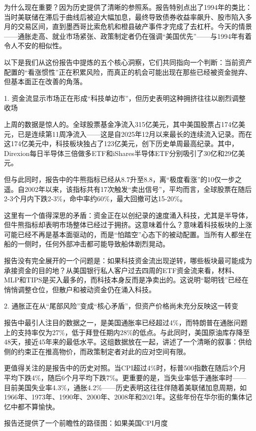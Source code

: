 \documentclass[11pt]{ctexart}
\begin{document}
为什么现在重要？因为历史提供了清晰的参照系。报告特别点出了1994年的类比：当时美联储在滞后于曲线后被迫大幅加息，最终导致债券收益率飙升、股市陷入多月的交易区间，直到墨西哥比索危机和橙县破产事件才完成了去杠杆。今天的情景——通胀走高、就业市场紧张、政策制定者仍在强调“美国优先”——与1994年有着令人不安的相似性。

以下是我们从这份报告中提炼的五个核心洞察，它们共同指向一个判断：当前资产配置的“看涨惯性”正在积累风险，而真正的机会可能出现在那些已经被资金抛弃、但基本面正在改善的角落。

1. 资金流显示市场正在形成“科技单边市”，但历史表明这种拥挤往往以剧烈调整收场

上周的数据是惊人的。全球股票基金净流入315亿美元，其中美国股票占174亿美元，已是连续第11周净流入——这是自2025年12月以来最长的连续流入记录。而在这174亿美元中，科技板块独占了123亿美元，创下历史单周最高纪录。其中，Direxion每日半导体三倍做多ETF和iShares半导体ETF分别吸引了30亿和29亿美元。

但与此同时，报告中的牛熊指标已经从8.7升至8.8，离“极度看涨”的10仅一步之遥。自2002年以来，该指标共有17次触发“卖出信号”，平均而言，全球股票在随后2-3个月内下跌2-3\%，命中率约60\%，最大回撤可达15-20\%。

这里有一个值得深思的矛盾：资金正在以创纪录的速度涌入科技，尤其是半导体，但牛熊指标却表明市场整体已经过于拥挤。这意味着什么？意味着科技板块的上涨可能已经不再是基本面驱动的，而是“怕踏空”心态下的被动配置。当所有人都坐在船的一侧时，任何外部冲击都可能导致船体剧烈晃动。

报告没有完全展开的一个问题是：如果科技资金流出现逆转，哪些板块最可能成为承接资金的目的地？从美国银行私人客户过去四周的ETF资金流来看，材料、MLP和TIPS是买入最多的，而科技本身反而是净卖出的。这说明“聪明钱”已经在悄悄调整仓位，但散户和被动资金仍在涌入科技。

2. 通胀正在从“尾部风险”变成“核心矛盾”，但资产价格尚未充分反映这一转变

报告中最引人注目的数据之一，是美国通胀率已经超过4\%，而特朗普在通胀问题上的支持率仅为27\%，低于拜登任期内28\%的低点。与此同时，美国原油库存降至48天，接近45年来的最低水平。这组数据放在一起，讲述了一个清晰的叙事：供给侧的约束正在推高物价，而政策制定者对此的应对空间有限。

更值得关注的是报告中的历史对照。当CPI超过4\%时，标普500指数在随后3个月平均下跌4\%，随后6个月平均下跌7\%。更重要的是，当失业率低于通胀率时——目前美国失业率4.3\%，通胀4.2\%——历史表明这往往伴随着美联储加息周期，如1966年、1973年、1990年、2000年、2008年和2021年。这些年份在华尔街的集体记忆中都不算愉快。

报告还提供了一个前瞻性的路径图：如果美国CPI月度
\end{document}
